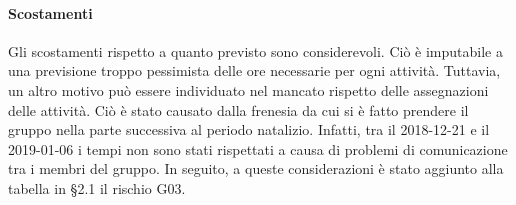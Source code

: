 		\paragraph{Scostamenti\\}
			Gli scostamenti rispetto a quanto previsto sono considerevoli. Ciò è imputabile a una previsione troppo pessimista delle ore necessarie per ogni attività. Tuttavia, un altro motivo può essere individuato nel mancato rispetto delle assegnazioni delle attività. Ciò è stato causato dalla frenesia da cui si è fatto prendere il gruppo nella parte successiva al periodo natalizio. Infatti, tra il 2018-12-21 e il 2019-01-06 i tempi non sono stati rispettati a causa di problemi di comunicazione tra i membri del gruppo. In seguito, a queste considerazioni è stato aggiunto alla tabella in §2.1 il rischio G03.